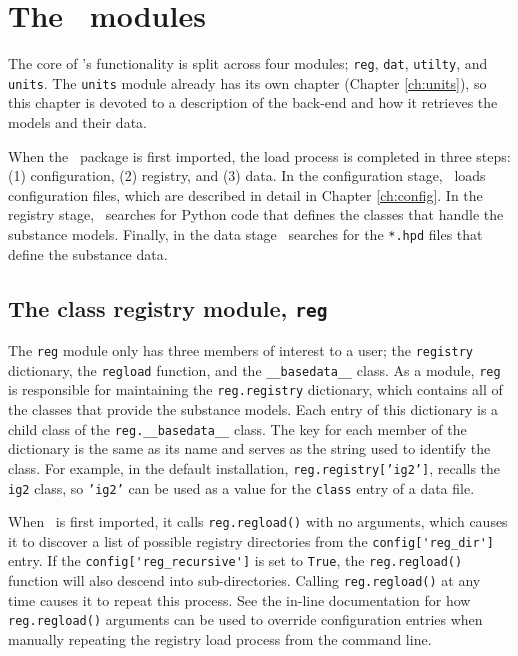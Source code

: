 \chapter{The \PM\ modules}\label{ch:regdat}

The core of \PM's functionality is split across four modules; \texttt{reg}, \texttt{dat}, \texttt{utilty}, and \texttt{units}.  The \texttt{units} module already has its own chapter (Chapter \ref{ch:units}), so this chapter is devoted to a description of the back-end and how it retrieves the models and their data.

When the \PM\ package is first imported, the load process is completed in three steps: (1) configuration, (2) registry, and (3) data.  In the configuration stage, \PM\ loads configuration files, which are described in detail in Chapter \ref{ch:config}.  In the registry stage, \PM\ searches for Python code that defines the classes that handle the substance models.  Finally, in the data stage \PM\ searches for the \texttt{*.hpd} files that define the substance data. 

\section{The class registry module, \texttt{reg}}

The \texttt{reg} module only has three members of interest to a user; the \texttt{registry} dictionary, the \texttt{regload} function, and the \verb|__basedata__| class.  As a module, \texttt{reg} is responsible for maintaining the \texttt{reg.registry} dictionary, which contains all of the classes that provide the substance models.  Each entry of this dictionary is a child class of the \verb|reg.__basedata__| class.  The key for each member of the dictionary is the same as its name and serves as the string used to identify the class.  For example, in the default installation, \texttt{reg.registry['ig2']}, recalls the \texttt{ig2} class, so \texttt{'ig2'} can be used as a value for the \texttt{class} entry of a data file.

When \PM\ is first imported, it calls \texttt{reg.regload()} with no arguments, which causes it to discover a list of possible registry directories from the \verb|config['reg_dir']| entry.  If the \verb|config['reg_recursive']| is set to \texttt{True}, the \texttt{reg.regload()} function will also descend into sub-directories.  Calling \texttt{reg.regload()} at any time causes it to repeat this process.  See the in-line documentation for how \texttt{reg.regload()} arguments can be used to override configuration entries when manually repeating the registry load process from the command line.

